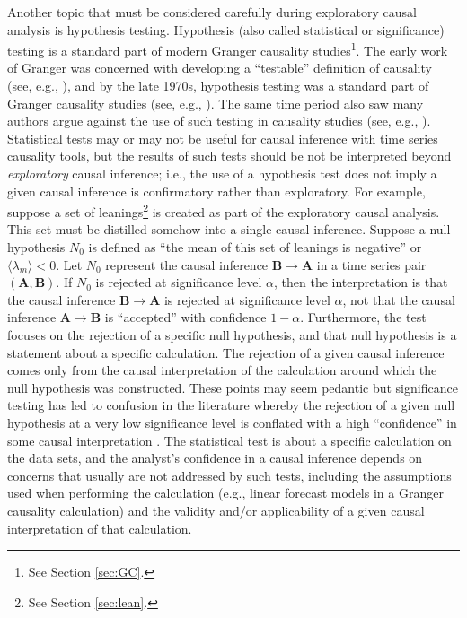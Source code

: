 Another topic that must be considered carefully during exploratory causal analysis is hypothesis testing.  Hypothesis (also called statistical or significance) testing is a standard part of modern Granger causality studies\footnote{See Section \ref{sec:GC}.}.  The early work of Granger was concerned with developing a ``testable'' definition of causality (see, e.g., \cite{Granger1963,Granger1969}), and by the late 1970s, hypothesis testing was a standard part of Granger causality studies (see, e.g., \cite{Pierce1977}).  The same time period also saw many authors argue against the use of such testing in causality studies (see, e.g., \cite{Schwert1979,Jacobs1979}).  Statistical tests may or may not be useful for causal inference with time series causality tools, but the results of such tests should be not be interpreted beyond {\em exploratory} causal inference; i.e., the use of a hypothesis test does not imply a given causal inference is confirmatory rather than exploratory.  For example, suppose a set of leanings\footnote{See Section \ref{sec:lean}.} is created as part of the exploratory causal analysis.  This set must be distilled somehow into a single causal inference.  Suppose a null hypothesis $N_0$ is defined as ``the mean of this set of leanings is negative'' or $\langle \lambda_m \rangle < 0$.  Let $N_0$ represent the causal inference $\mathbf{B}\rightarrow\mathbf{A}$ in a time series pair $(\mathbf{A},\mathbf{B})$.  If $N_0$ is rejected at significance level $\alpha$, then the interpretation is that the causal inference $\mathbf{B}\rightarrow\mathbf{A}$ is rejected at significance level $\alpha$, not that the causal inference $\mathbf{A}\rightarrow\mathbf{B}$ is ``accepted'' with confidence $1-\alpha$.  Furthermore, the test focuses on the rejection of a specific null hypothesis, and that null hypothesis is a statement about a specific calculation.  The rejection of a given causal inference comes only from the causal interpretation of the calculation around which the null hypothesis was constructed.  These points may seem pedantic but significance testing has led to confusion in the literature whereby the rejection of a given null hypothesis at a very low significance level is conflated with a high ``confidence'' in some causal interpretation \cite{Schwert1979,Jacobs1979}.  The statistical test is about a specific calculation on the data sets, and the analyst's confidence in a causal inference depends on concerns that usually are not addressed by such tests, including the assumptions used when performing the calculation (e.g., linear forecast models in a Granger causality calculation) and the validity and/or applicability of a given causal interpretation of that calculation. 

